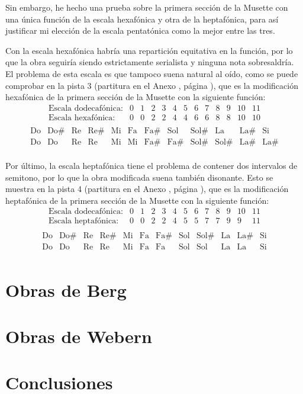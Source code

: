    	Sin embargo, he hecho una prueba sobre la primera sección de la Musette con una única función de la escala hexafónica y otra de la heptafónica, para así justificar mi elección de la escala pentatónica como la mejor entre las tres.
   	
   	Con la escala hexafónica habría una repartición equitativa en la función, por lo que la obra seguiría siendo estrictamente serialista y ninguna nota sobresaldría. El problema de esta escala es que tampoco suena natural al oído, como se puede comprobar en la pista 3 (partitura en el Anexo , página ), que es la modificación hexafónica de la primera sección de la Musette con la siguiente función:
   	$$\left.\begin{matrix}\text{Escala dodecafónica:}&0&1&2&3&4&5&6&7&8&9&10&11\\\text{Escala hexafónica:}&0&0&2&2&4&4&6&6&8&8&10&10\\\end{matrix}\right.$$
   	$$\left.\begin{matrix}\text{Do}&\text{Do\#}&\text{Re}&\text{Re\#}&\text{Mi}&\text{Fa}&\text{Fa\#}&\text{Sol}&\text{Sol\#}&\text{La}&\text{La\#}&\text{Si}\\\text{Do}&\text{Do}&\text{Re}&\text{Re}&\text{Mi}&\text{Mi}&\text{Fa\#}&\text{Fa\#}&\text{Sol\#}&\text{Sol\#}&\text{La\#}&\text{La\#}\\\end{matrix}\right.$$
   	
   	Por último, la escala heptafónica tiene el problema de contener dos intervalos de semitono, por lo que la obra modificada suena también disonante. Esto se muestra en la pista 4 (partitura en el Anexo , página ), que es la modificación heptafónica de la primera sección de la Musette con la siguiente función:
   	$$\left.\begin{matrix}\text{Escala dodecafónica:}&0&1&2&3&4&5&6&7&8&9&10&11\\\text{Escala heptafónica:}&0&0&2&2&4&5&5&7&7&9&9&11\\\end{matrix}\right.$$
   	$$\left.\begin{matrix}\text{Do}&\text{Do\#}&\text{Re}&\text{Re\#}&\text{Mi}&\text{Fa}&\text{Fa\#}&\text{Sol}&\text{Sol\#}&\text{La}&\text{La\#}&\text{Si}\\\text{Do}&\text{Do}&\text{Re}&\text{Re}&\text{Mi}&\text{Fa}&\text{Fa}&\text{Sol}&\text{Sol}&\text{La}&\text{La}&\text{Si}\\\end{matrix}\right.$$	
   
    \section{Obras de Berg}
    \section{Obras de Webern}
    \section{Conclusiones}
